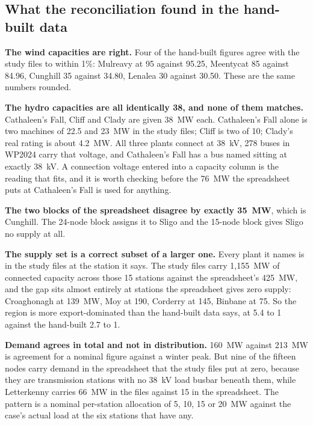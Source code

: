 \documentclass[11pt,a4paper]{article}
\begin{document}

\subsection{What the reconciliation found in the hand-built data}

\textbf{The wind capacities are right.} Four of the hand-built figures agree
with the study files to within 1\%: Mulreavy at 95 against 95.25, Meentycat 85
against 84.96, Cunghill 35 against 34.80, Lenalea 30 against 30.50. These are
the same numbers rounded.

\textbf{The hydro capacities are all identically 38, and none of them matches.}
Cathaleen's Fall, Cliff and Clady are given 38~MW each. Cathaleen's Fall alone
is two machines of 22.5 and 23~MW in the study files; Cliff is two of 10;
Clady's real rating is about 4.2~MW. All three plants connect at 38~kV, 278
buses in WP2024 carry that voltage, and Cathaleen's Fall has a bus named
 sitting at exactly 38~kV. A connection voltage entered
into a capacity column is the reading that fits, and it is worth checking
before the 76~MW the spreadsheet puts at Cathaleen's Fall is used for anything.

\textbf{The two blocks of the spreadsheet disagree by exactly 35~MW}, which is
Cunghill. The 24-node block assigns it to Sligo and the 15-node block gives
Sligo no supply at all.

\textbf{The supply set is a correct subset of a larger one.} Every
plant it names is in the study files at the station it says. The study files
carry 1{,}155~MW of connected capacity across those 15 stations against the
spreadsheet's 425~MW, and the gap sits almost entirely at stations the
spreadsheet gives zero supply: Croaghonagh at 139~MW, Moy at 190, Corderry at
145, Binbane at 75. So the region is more export-dominated than the hand-built
data says, at 5.4 to 1 against the hand-built 2.7 to 1.

\textbf{Demand agrees in total and not in distribution.} 160~MW against
213~MW is agreement for a nominal figure against a winter peak. But nine of the
fifteen nodes carry demand in the spreadsheet that the study files put at zero,
because they are transmission stations with no 38~kV load busbar beneath them,
while Letterkenny carries 66~MW in the files against 15 in the spreadsheet.
The pattern is a nominal per-station allocation of 5, 10, 15 or 20~MW against
the case's actual load at the six stations that have any.
\end{document}
